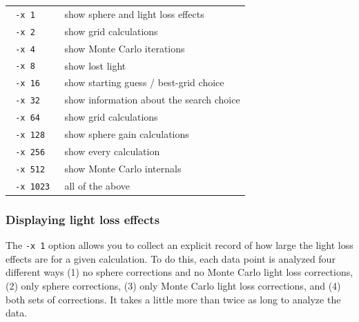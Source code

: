 \documentclass{article}
\begin{document}
\begin{center}
\begin{tabular}{lp{7cm}}
\texttt{ -x 1                }& show sphere and light loss effects              \\
\texttt{ -x 2                }& show grid calculations             \\
\texttt{ -x 4                }& show Monte Carlo iterations              \\
\texttt{ -x 8                }& show lost light          \\
\texttt{ -x 16               }& show starting guess / best-grid choice         \\
\texttt{ -x 32               }& show information about the search choice       \\
\texttt{ -x 64               }& show grid calculations                         \\
\texttt{ -x 128              }& show sphere gain calculations                  \\
\texttt{ -x 256              }& show every calculation                         \\
\texttt{ -x 512              }& show Monte Carlo internals                     \\
\texttt{ -x 1023             }& all of the above                               \\
\end{tabular}
\end{center}

\subsubsection{Displaying light loss effects}
The \texttt{-x 1} option allows you to collect an explicit record of how
large the light loss effects are for a given calculation.  To do this,
each data point is analyzed four different ways (1) no sphere corrections
and no Monte Carlo light loss corrections, (2) only sphere corrections,
(3) only Monte Carlo light loss corrections, and (4) both sets of corrections.
It takes a little more than twice as long to analyze the data.
\end{document}
